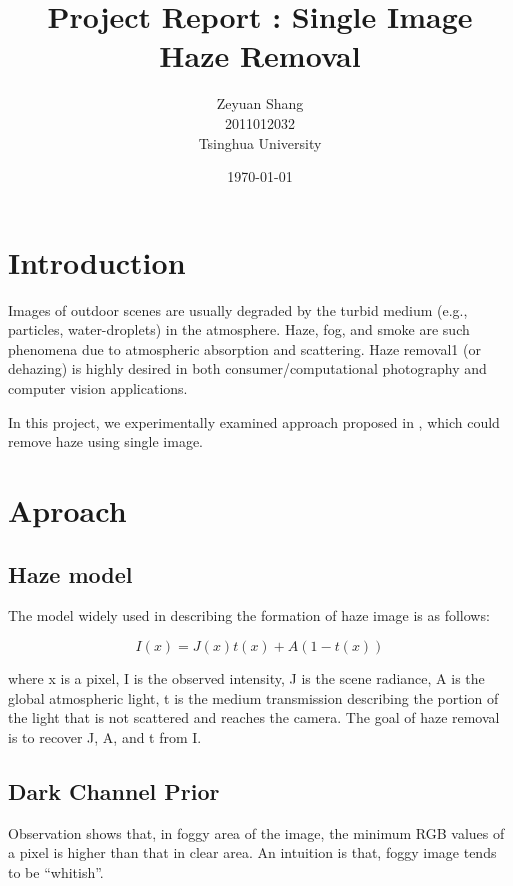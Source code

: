 \documentclass{article}
\begin{document}
\setlength{\parindent}{2em}
\linespread{1}

\title{Project Report : Single Image Haze Removal}
\author{Zeyuan Shang \\ 2011012032 \\ Tsinghua University}
\date{\today}
\maketitle

\section{Introduction}
    
    Images of outdoor scenes are usually degraded by the turbid medium (e.g., particles, water-droplets) in the atmosphere. Haze, fog, and smoke are such phenomena due to atmospheric absorption and scattering. Haze removal1 (or dehazing) is highly desired in both consumer/computational photography and computer vision applications.

    In this project, we experimentally examined approach proposed in \cite{Kaiming}, which could remove haze using single image.

\section{Aproach}

    \subsection{Haze model}

        The model widely used in describing the formation of haze image is as follows:
        
        $$I(x) = J(x)t(x) + A(1 - t(x))$$

        where x is a pixel, I is the observed intensity, J is the scene radiance, A is the global atmospheric light, t is the medium transmission describing the portion of the light that is not scattered and reaches the camera. The goal of haze removal is to recover J, A, and t from I.

    \subsection{Dark Channel Prior}

        Observation shows that, in foggy area of the image, the minimum RGB values of a pixel is higher than that in clear area. An intuition is that, foggy image tends to be “whitish”.
\end{document}
